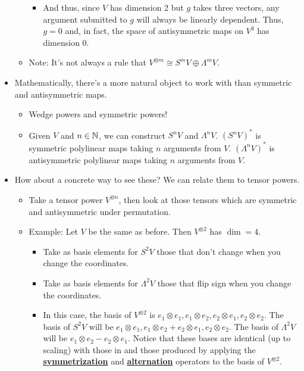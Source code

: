\documentclass[../notes.tex]{subfiles}
\begin{document}
\begin{itemize}
\begin{itemize}
\begin{itemize}
            \item And thus, since $V$ has dimension 2 but $g$ takes three vectors, any argument submitted to $g$ will always be linearly dependent. Thus, $g=0$ and, in fact, the space of antisymmetric maps on $V^3$ has dimension 0.
        \end{itemize}
        \item Note: It's not always a rule that $V^{\otimes m}\cong S^mV\oplus\Lambda^mV$.
    \end{itemize}
    \item Mathematically, there's a more natural object to work with than symmetric and antisymmetric maps.
    \begin{itemize}
        \item Wedge powers and symmetric powers!
        \item Given $V$ and $n\in\mathbb{N}$, we can construct $S^nV$ and $\Lambda^nV$. $(S^nV)^*$ is symmetric polylinear maps taking $n$ arguments from $V$. $(\Lambda^nV)^*$ is antisymmetric polylinear maps taking $n$ arguments from $V$.
    \end{itemize}
    \item How about a concrete way to see these? We can relate them to tensor powers.
    \begin{itemize}
        \item Take a tensor power $V^{\otimes n}$, then look at those tensors which are symmetric and antisymmetric under permutation.
        \item Example: Let $V$ be the same as before. Then $V^{\otimes 2}$ has $\dim=4$.
        \begin{itemize}
            \item Take as basis elements for $S^2V$ those that don't change when you change the coordinates.
            \item Take as basis elements for $\Lambda^2V$ those that flip sign when you change the coordinates.
            \item In this case, the basis of $V^{\otimes 2}$ is $e_1\otimes e_1,e_1\otimes e_2,e_2\otimes e_1,e_2\otimes e_2$. The basis of $S^2V$ will be $e_1\otimes e_1,e_1\otimes e_2+e_2\otimes e_1,e_2\otimes e_2$. The basis of $\Lambda^2V$ will be $e_1\otimes e_2-e_2\otimes e_1$. Notice that these bases are identical (up to scaling) with those in \textcite{bib:Serre} and those produced by applying the \href{https://en.wikipedia.org/wiki/Symmetrization}{\textbf{symmetrization}} and \href{https://en.wikipedia.org/wiki/Exterior_algebra#Alternating_tensor_algebra}{\textbf{alternation}} operators to the basis of $V^{\otimes 2}$.

\end{itemize}
\end{itemize}
\end{itemize}
\end{document}
